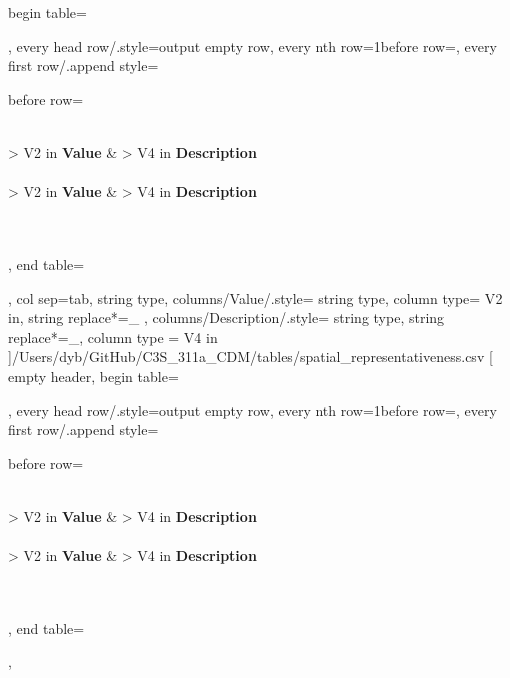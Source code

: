 \documentclass[a4paper]{article}
\begin{document}
    begin table=\begin{longtable},
    every head row/.style={output empty row},
    every nth row={1}{before row=\hline},
    every first row/.append style={
        before row={%
            \caption{Spatial representativeness}
            \label{tab:DataTable}\\
            \hline\hline {} { > {\centering}V{2 in}} { \textbf{Value}} &  { > {\centering} V{4 in} } {\textbf{Description}} \\ \hline\hline \endfirsthead
             \\
            \hline\hline {} { > {\centering}V{2 in} } { \textbf{Value}} &  { > {\centering} V{4 in} } {\textbf{Description}} \\ \hline\hline \endhead
             \\
            \endfoot
            \hline
             \\ 
            \endlastfoot
        }
    },
    end table=\end{longtable},
    col sep=tab,
    string type,
    columns/Value/.style={
            string type, 
            column type= V{2 in}, 
            string replace*={_}{}
        },
    columns/Description/.style={
            string type, 
            string replace*={_}{},
            column type = V{4 in}
        }
    ]{/Users/dyb/GitHub/C3S_311a_CDM/tables/spatial_representativeness.csv}
\pgfplotstabletypeset[
    empty header,
    begin table=\begin{longtable},
    every head row/.style={output empty row},
    every nth row={1}{before row=\hline},
    every first row/.append style={
        before row={%
            \caption{Station type}
            \label{tab:DataTable}\\
            \hline\hline {} { > {\centering}V{2 in}} { \textbf{Value}} &  { > {\centering} V{4 in} } {\textbf{Description}} \\ \hline\hline \endfirsthead
             \\
            \hline\hline {} { > {\centering}V{2 in} } { \textbf{Value}} &  { > {\centering} V{4 in} } {\textbf{Description}} \\ \hline\hline \endhead
             \\
            \endfoot
            \hline
             \\ 
            \endlastfoot
        }
    },
    end table=\end{longtable},
\end{document}
